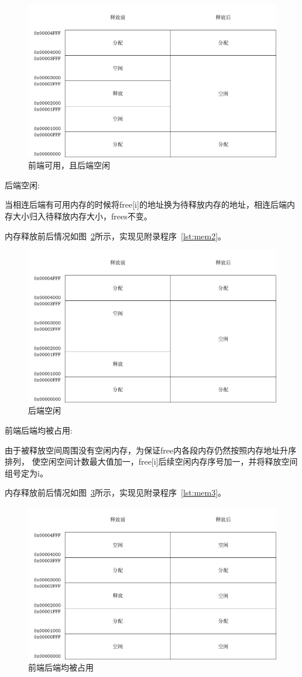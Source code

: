 \begin{figure}[h]
  \centering
  \includegraphics[width=.7\textwidth]{../Fig/mem1.pdf}
  \caption{前端可用，且后端空闲}
  \label{fig:mem1}
\end{figure}


\newpage
后端空闲:

当相连后端有可用内存的时候将free[i]的地址换为待释放内存的地址，相连后端内存大小归入待释放内存大小，frees不变。

内存释放前后情况如图~\ref{fig:mem2}所示，实现见附录程序~\ref{lst:mem2}。

\begin{figure}[h]
  \centering
  \includegraphics[width=.7\textwidth]{../Fig/mem2.pdf}
  \caption{后端空闲}
  \label{fig:mem2}
\end{figure}


前端后端均被占用:

由于被释放空间周围没有空闲内存，为保证free内各段内存仍然按照内存地址升序排列，
使空闲空间计数最大值加一，free[i]后续空闲内存序号加一，并将释放空间组号定为i。

内存释放前后情况如图~\ref{fig:mem3}所示，实现见附录程序~\ref{lst:mem3}。
\begin{figure}[h]
  \centering
  \includegraphics[width=.7\textwidth]{../Fig/mem3.pdf}
  \caption{前端后端均被占用}
  \label{fig:mem3}
\end{figure}